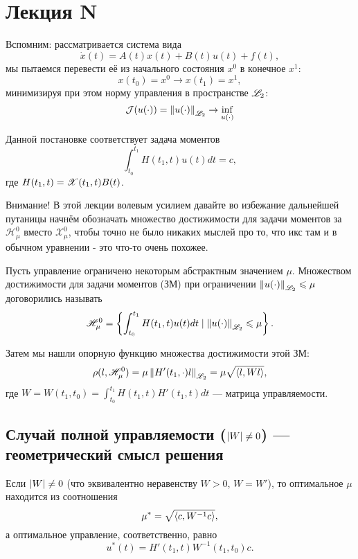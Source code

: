 \chapter{Лекция N}
Вспомним: рассматривается система вида
\begin{equation}
    \dot{x}(t) = A(t) x(t) + B(t) u (t) + f(t),
\end{equation}
мы пытаемся перевести её из начального состояния $x^0$ в конечное $x^1$:
\begin{equation}
    x(t_0) = x^0 \to x(t_1) = x^1,
\end{equation}
минимизируя при этом норму управления в пространстве $\mathscr{L}_2$:
\begin{equation}
    \mathcal{J}(u(\cdot)) = \left\lVert u(\cdot) \right\rVert_{\mathscr{L}_2} \to \inf\limits_{u(\cdot)}
\end{equation}

Данной постановке соответствует задача моментов
\begin{equation}\tag{ЗМ}
    \int_{t_0}^{t_1} H(t_1, t) u(t) dt = c,
\end{equation}
где $H(t_1, t) = \mathscr{X}(t_1, t) B(t)$.

\begin{bf}Внимание! В этой лекции волевым усилием давайте во избежание дальнейшей путаницы начнём обозначать множество достижимости для задачи моментов за $\mathscr{H}_{\mu}^0$ вместо $\mathscr{X}_{\mu}^0$, чтобы точно не было никаких мыслей про то, что икс там и в обычном уравнении - это что-то очень похожее.\end{bf}

Пусть управление ограничено некоторым абстрактным значением $\mu$. Множеством достижимости для задачи моментов (ЗМ) при ограничении $\left\lVert u(\cdot) \right\rVert_{\mathscr{L}_2} \leqslant \mu$ договорились называть
\begin{equation}
    \mathscr{H}_{\mu}^0 = \left\{ \int_{t_0}^{t_1} H(t_1, t) u(t) dt \mid \left\lVert u(\cdot) \right\rVert_{\mathscr{L}_2} \leqslant \mu \right\}.
\end{equation}

Затем мы нашли опорную функцию множества достижимости этой ЗМ:
$$
\rho(l, \mathscr{H}_{\mu}^0) = \mu \left\lVert H'(t_1, \cdot)l \right\rVert_{\mathscr{L}_2} = \mu \sqrt{\left < l, Wl \right >},
$$
где $W = W(t_1, t_0) = \int_{t_0}^{t_1} H(t_1, t) H'(t_1, t) dt$ --- матрица управляемости.

\section{Случай полной управляемости ($\left\lvert W \right\rvert \neq 0$) --- геометрический смысл решения}
Если $\left\lvert W \right\rvert \neq 0$ (что эквивалентно неравенству $W > 0$, $W = W'$), то оптимальное $\mu$ находится из соотношения
$$
\mu^* = \sqrt{\left < c, W^{-1}c \right >},
$$
а оптимальное управление, соответственно, равно
$$
u^*(t) = H'(t_1,t) W^{-1}(t_1, t_0) c.
$$

